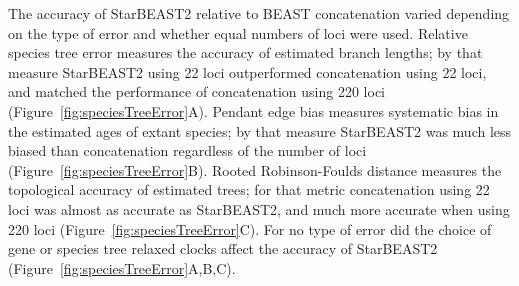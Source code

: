 \documentclass[nogrid]{MBE}%
\begin{document}
The accuracy of StarBEAST2 relative to BEAST concatenation varied depending on the
type of error and whether equal numbers of loci were used. Relative species tree
error measures the accuracy of estimated branch lengths; by that measure
StarBEAST2 using 22 loci outperformed concatenation using 22 loci, and matched
the performance of concatenation using 220 loci
(Figure~\ref{fig:speciesTreeError}A). Pendant edge bias measures systematic bias
in the estimated ages of extant species; by that measure StarBEAST2 was much
less biased than concatenation regardless of the number of loci
(Figure~\ref{fig:speciesTreeError}B). Rooted Robinson-Foulds distance measures
the topological accuracy of estimated trees; for that metric concatenation using
22 loci was almost as accurate as StarBEAST2, and much more accurate when using
220 loci (Figure~\ref{fig:speciesTreeError}C). For no type of error did the
choice of gene or species tree relaxed clocks affect the accuracy of StarBEAST2
(Figure~\ref{fig:speciesTreeError}A,B,C).
\end{document}
